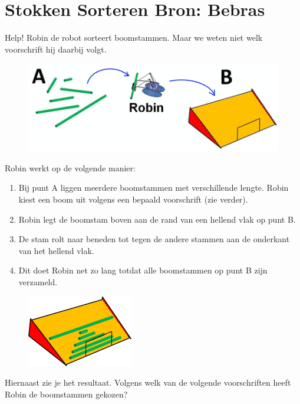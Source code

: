 \documentclass[12pt, a4paper]{article}
\begin{document}
	\begin{minipage}{\textwidth}
		\section{Stokken Sorteren \hfill\small Bron: Bebras}
			
			Help! Robin de robot sorteert boomstammen. Maar we weten niet welk voorschrift hij daarbij volgt.
			
			\begin{figure}[H]
				\centering
				\includegraphics[width=0.7\linewidth]{image1} 
			\end{figure}

			Robin werkt op de volgende manier:
			
			\begin{enumerate}
				\item Bij punt A liggen meerdere boomstammen met verschillende lengte. Robin kiest een boom uit volgens een bepaald voorschrift (zie verder).
				\item Robin legt de boomstam boven aan de rand van een hellend vlak op punt B.
				\item De stam rolt naar beneden tot tegen de andere stammen aan de onderkant van het hellend vlak.
				\item Dit doet Robin net zo lang totdat alle boomstammen op punt B zijn verzameld.
			\end{enumerate}
		
			\begin{minipage}{0.3\linewidth}
				\begin{figure}[H]
					\centering
					\includegraphics[width=\linewidth]{image2} 
				\end{figure}
			\end{minipage} \hfill
			\begin{minipage}{0.7\linewidth}
				Hiernaast zie je het resultaat. Volgens welk van de volgende voorschriften heeft Robin de boomstammen gekozen?
			\end{minipage} \\
		

\end{minipage}
\end{document}
